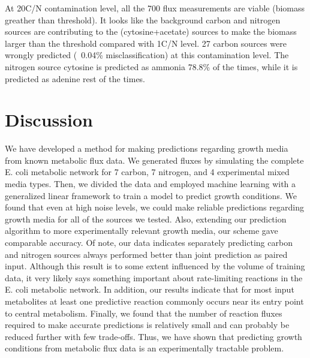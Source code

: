 \documentclass[12pt]{article}
\begin{document}
At 20C/N contamination level, all the 700 flux measurements are viable (biomass greather than threshold). It looks like the background carbon and nitrogen sources are contributing to the (cytosine+acetate) sources to make the biomass larger than the threshold compared with 1C/N level. 27 carbon sources were wrongly predicted (~0.04\% misclassification) at this contamination level. The nitrogen source cytosine is predicted as ammonia 78.8\% of the times, while it is predicted as adenine rest of the times. 

\section*{Discussion}

We have developed a method for making predictions regarding growth media from known metabolic flux data. We generated fluxes by simulating the complete E. coli metabolic network for 7 carbon, 7 nitrogen, and 4 experimental mixed media types. Then, we divided the data and employed machine learning with a generalized linear framework to train a model to predict growth conditions. We found that even at high noise levels, we could make reliable predictions regarding growth media for all of the sources we tested. Also, extending our prediction algorithm to more experimentally relevant growth media, our scheme gave comparable accuracy. Of note, our data indicates separately predicting carbon and nitrogen sources always performed better than joint prediction as paired input. Although this result is to some extent influenced by the volume of training data, it very likely says something important about rate-limiting reactions in the E. coli metabolic network. In addition, our results indicate that for most input metabolites at least one predictive reaction commonly occurs near its entry point to central metabolism. Finally, we found that the number of reaction fluxes required to make accurate predictions is relatively small and can probably be reduced further with few trade-offs. Thus, we have shown that predicting growth conditions from metabolic flux data is an experimentally tractable problem.
\end{document}

